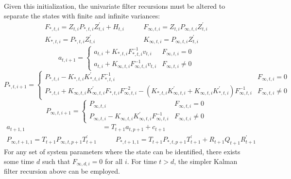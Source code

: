 \documentclass[12pt]{article}
\begin{document}
	Given this initialization, the univariate filter recursions must be altered to separate the states with finite and infinite variances: 
	\begin{align*}
	 F_{*,t,i} = Z_{t,i} P_{*,t,i} Z_{t,i}^\prime + H_{t,i} &\qquad F_{\infty,t,i} = Z_{t,i} P_{\infty,t,i} Z_{t,i}^\prime\\
	K_{*,t,i} = P_{*,t,i} Z_{t,i}^\prime &\qquad K_{\infty,t,i} = P_{\infty,t,i} Z_{t,i}^\prime
	\end{align*}
	\begin{equation*}
	a_{t,i+1} = \begin{cases} 
	      a_{t,i} + K_{*,t,i} F_{*,t,i}^{-1} v_{t,i} & F_{\infty,t,i} = 0 \\
	      a_{t,i} + K_{\infty,t,i} F_{\infty,t,i}^{-1} v_{t,i} & F_{\infty,t,i} \neq 0
    \end{cases} 
    \end{equation*}
	\begin{equation*}
	P_{*,t,i+1} = \begin{cases} 
	   P_{*,t,i} - K_{*,t,i} K_{*,t,i}^\prime F_{*,t,i}^{-1} & F_{\infty,t,i} = 0 \\
	   P_{*,t,i} + K_{\infty,t,i} K_{\infty,t,i}^\prime F_{*,t,i} F_{\infty,t,i}^{-2} - (K_{*,t,i} K_{\infty,t,i}^\prime + K_{\infty,t,i} K_{*,t,i}^\prime) F_{\infty,t,i}^{-1} & F_{\infty,t,i} \neq 0
	\end{cases}
	\end{equation*}
	\begin{equation*}
	P_{\infty,t,i+1} = \begin{cases} 
	   P_{\infty,t,i} & F_{\infty,t,i} = 0 \\
	   P_{\infty,t,i} - K_{\infty,t,i} K_{\infty,t,i}^\prime F_{\infty,t,i}^{-1} & F_{\infty,t,i} \neq 0	   
	\end{cases} 
	\end{equation*}
	\begin{align*}
	a_{t+1,1} &= T_{t+1} a_{t, p+1} + c_{t+1} \\
	P_{\infty,t+1,1} = T_{t+1} P_{\infty,t,p+1} T_{t+1}^\prime &\qquad P_{*,t+1,1} = T_{t+1} P_{*,t,p+1} T_{t+1}^\prime + R_{t+1} Q_{t+1} R_{t+1}^\prime 
	\end{align*}
	For any set of system parameters where the state can be identified, there exists some time $d$ such that $F_{\infty,d,i} = 0$ for all $i$. For time $t > d$, the simpler Kalman filter recursion above can be employed. 
\end{document}
